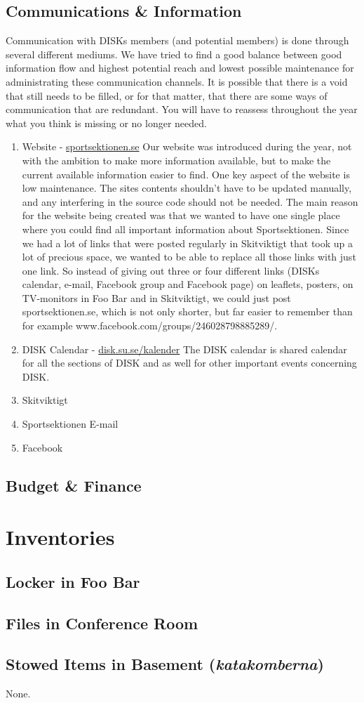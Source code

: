 \documentclass[12pt,a4paper]{article}
\begin{document}
		\subsection{Communications \& Information}
		Communication with DISKs members (and potential members) is done through several different mediums. We have tried to find a good balance between good information flow and highest potential reach and lowest possible maintenance for administrating these communication channels. It is possible that there is a void that still needs to be filled, or for that matter, that there are some ways of communication that are redundant. You will have to reassess throughout the year what you think is missing or no longer needed.
			\begin{enumerate}
				\item Website - \href{http://sportsektionen.se}{sportsektionen.se}
				Our website was introduced during the year, not with the ambition to make more information available, but to make the current available information easier to find. One key aspect of the website is low maintenance. The sites contents shouldn't have to be updated manually, and any interfering in the source code should not be needed. The main reason for the website being created was that we wanted to have one single place where you could find all important information about Sportsektionen. Since we had a lot of links that were posted regularly in Skitviktigt that took up a lot of precious space, we wanted to be able to replace all those links with just one link. So instead of giving out three or four different links (DISKs calendar, e-mail, Facebook group and Facebook page) on leaflets, posters, on TV-monitors in Foo Bar and in Skitviktigt, we could just post sportsektionen.se, which is not only shorter, but far easier to remember than for example www.facebook.com/groups/246028798885289/.
				\item DISK Calendar - \href{http://disk.su.se/kalender}{disk.su.se/kalender}
				The DISK calendar is shared calendar for all the sections of DISK and as well for other important events concerning DISK.
				\item Skitviktigt
				\item Sportsektionen E-mail
				\item Facebook
			\end{enumerate}
		\subsection{Budget \& Finance}

	\section{Inventories}
		\subsection{Locker in Foo Bar}
		\subsection{Files in Conference Room}
		\subsection{Stowed Items in Basement (\emph{katakomberna})}
			None.
\end{document}
